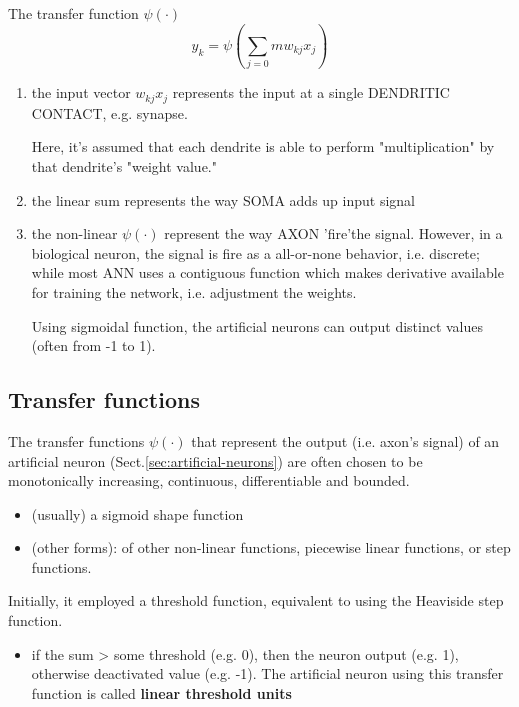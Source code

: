 The transfer function $\psi(\cdot)$
\begin{equation}
y_k = \psi \left( \sum_{j=0}{m} w_{kj} x_{j} \right)
\end{equation}

\begin{enumerate}
  \item the input vector $w_{kj}x_{j}$ represents the input at a single
  DENDRITIC CONTACT, e.g. synapse. 
  
  Here, it's assumed that each dendrite is able to perform "multiplication" by
  that dendrite's "weight value."
  
  \item the linear sum represents the way SOMA adds up input signal
  
  \item the non-linear $\psi(\cdot)$ represent the way AXON 'fire'the signal.
  However, in a biological neuron, the signal is fire as a all-or-none behavior,
  i.e. discrete; while most ANN uses a contiguous function which makes 
  derivative available for training the network, i.e. adjustment the weights.
  
 Using sigmoidal function, the  artificial neurons can output distinct
 values (often from -1 to 1).

\end{enumerate}

\subsection{Transfer functions}
\label{sec:transfer-function}

The transfer functions $\psi(\cdot)$ that represent the output (i.e. axon's
signal) of an artificial neuron (Sect.\ref{sec:artificial-neurons}) are often
chosen to be monotonically increasing, continuous, differentiable and bounded.

\begin{itemize}
  \item (usually) a sigmoid shape function
  
  \item (other forms): of  other non-linear functions, piecewise linear
  functions, or step functions. 
\end{itemize}

Initially, it employed a threshold function, equivalent to using the Heaviside
step function. 
\begin{itemize}
  \item if the sum > some threshold (e.g. 0), then the neuron output (e.g. 1),
  otherwise deactivated value (e.g. -1). The artificial neuron using this
  transfer function is called {\bf linear threshold units}

\end{itemize}

